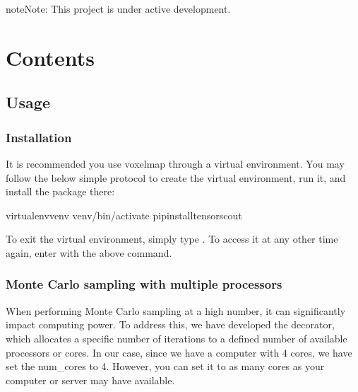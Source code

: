 \documentclass[letterpaper,10pt,english]{sphinxmanual}
\let\sphinxpxdimen\pdfpxdimen\else\newdimen\sphinxpxdimen
\begin{document}
\noindent\sphinxincludegraphics[width=500\sphinxpxdimen]{{colaboratory}.png}

\begin{sphinxadmonition}{note}{Note:}
\sphinxAtStartPar
This project is under active development.
\end{sphinxadmonition}


\chapter{Contents}
\label{\detokenize{index:contents}}
\sphinxstepscope


\section{Usage}
\label{\detokenize{usage:usage}}\label{\detokenize{usage::doc}}

\subsection{Installation}
\label{\detokenize{usage:installation}}\label{\detokenize{usage:id1}}
\sphinxAtStartPar
It is recommended you use voxelmap through a virtual environment. You may follow the below simple protocol to create the virtual environment, run it, and install the package there:

\begin{sphinxVerbatim}[commandchars=\\\{\}]
virtualenvvenv
venv/bin/activate
 pipinstalltensorscout
\end{sphinxVerbatim}

\sphinxAtStartPar
To exit the virtual environment, simply type . To access it at any other time again, enter with the above  command.


\subsection{Monte Carlo sampling with multiple processors}
\label{\detokenize{usage:monte-carlo-sampling-with-multiple-processors}}
\sphinxAtStartPar
When performing Monte Carlo sampling at a high number, it can significantly impact computing power.
To address this, we have developed the  decorator, which allocates a specific number of iterations to
a defined number of available processors or cores. In our case, since we have a computer with 4 cores, we have set
the num\_cores to 4. However, you can set it to as many cores as your computer or server may have available.
\end{document}

